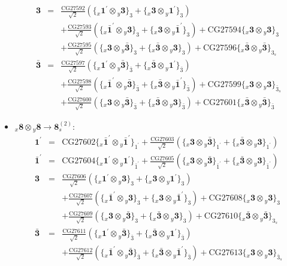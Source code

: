 \documentclass[english]{article}
\newcommand{\rep}[1]{\mathbf{#1}}
\newcommand{\repx}[2]{{}_{#2}\mathbf{#1}}
\newcommand{\subcg}[3]{\big\{ \repx{#1}{x}\otimes\repx{#2}{y}\big\}^{}_{#3}}
\begin{document}
\begin{itemize}
\begin{eqnarray*}
\\
\rep{3} &=& \frac{\text{CG27592}}{\sqrt{2}}\left(\subcg{1^{\prime}}{3}{3}+\subcg{3}{1^{\prime}}{3}\right) \\ 
 & & +\frac{\text{CG27593}}{\sqrt{2}}\left(\subcg{\bar{1}^{\prime}}{3}{3}+\subcg{3}{\bar{1}^{\prime}}{3}\right)+\text{CG27594}\subcg{3}{3}{3} \\ 
 & & +\frac{\text{CG27595}}{\sqrt{2}}\left(\subcg{3}{\bar{3}}{3}+\subcg{\bar{3}}{3}{3}\right)+\text{CG27596}\subcg{\bar{3}}{\bar{3}}{3_{s}}
\\
\rep{\bar{3}} &=& \frac{\text{CG27597}}{\sqrt{2}}\left(\subcg{1^{\prime}}{\bar{3}}{\bar{3}}+\subcg{\bar{3}}{1^{\prime}}{\bar{3}}\right) \\ 
 & & +\frac{\text{CG27598}}{\sqrt{2}}\left(\subcg{\bar{1}^{\prime}}{\bar{3}}{\bar{3}}+\subcg{\bar{3}}{\bar{1}^{\prime}}{\bar{3}}\right)+\text{CG27599}\subcg{3}{3}{\bar{3}_{s}} \\ 
 & & +\frac{\text{CG27600}}{\sqrt{2}}\left(\subcg{3}{\bar{3}}{\bar{3}}+\subcg{\bar{3}}{3}{\bar{3}}\right)+\text{CG27601}\subcg{\bar{3}}{\bar{3}}{\bar{3}}
\end{eqnarray*}
\item $\repx{8}{x}\otimes\repx{8}{y}\to\rep{8}_{s}^{(2)}$:
\begin{eqnarray*}
\rep{1^{\prime}} &=& \text{CG27602}\subcg{\bar{1}^{\prime}}{\bar{1}^{\prime}}{1^{\prime}}+\frac{\text{CG27603}}{\sqrt{2}}\left(\subcg{3}{\bar{3}}{1^{\prime}}+\subcg{\bar{3}}{3}{1^{\prime}}\right)
\\
\rep{\bar{1}^{\prime}} &=& \text{CG27604}\subcg{1^{\prime}}{1^{\prime}}{\bar{1}^{\prime}}+\frac{\text{CG27605}}{\sqrt{2}}\left(\subcg{3}{\bar{3}}{\bar{1}^{\prime}}+\subcg{\bar{3}}{3}{\bar{1}^{\prime}}\right)
\\
\rep{3} &=& \frac{\text{CG27606}}{\sqrt{2}}\left(\subcg{1^{\prime}}{3}{3}+\subcg{3}{1^{\prime}}{3}\right) \\ 
 & & +\frac{\text{CG27607}}{\sqrt{2}}\left(\subcg{\bar{1}^{\prime}}{3}{3}+\subcg{3}{\bar{1}^{\prime}}{3}\right)+\text{CG27608}\subcg{3}{3}{3} \\ 
 & & +\frac{\text{CG27609}}{\sqrt{2}}\left(\subcg{3}{\bar{3}}{3}+\subcg{\bar{3}}{3}{3}\right)+\text{CG27610}\subcg{\bar{3}}{\bar{3}}{3_{s}}
\\
\rep{\bar{3}} &=& \frac{\text{CG27611}}{\sqrt{2}}\left(\subcg{1^{\prime}}{\bar{3}}{\bar{3}}+\subcg{\bar{3}}{1^{\prime}}{\bar{3}}\right) \\ 
 & & +\frac{\text{CG27612}}{\sqrt{2}}\left(\subcg{\bar{1}^{\prime}}{\bar{3}}{\bar{3}}+\subcg{\bar{3}}{\bar{1}^{\prime}}{\bar{3}}\right)+\text{CG27613}\subcg{3}{3}{\bar{3}_{s}} \\ 

\end{eqnarray*}
\end{itemize}
\end{document}
